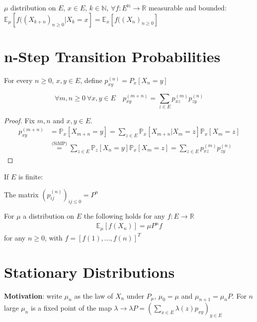 \begin{cor}
	$\mu$ distribution on $E$, $x \in E$, $k \in \mathbb{N}$, $\forall f: E^{\mathbb{N}} \to \mathbb{R}$ measurable and bounded:
	$\mathbb{E}_\mu \left[ f((X_{k+n})_{n \geq 0} | X_k =x \right] = \mathbb{E} _x \left[ f((X_n)_{n \geq 0} \right]  $
\end{cor}

\noindent
\section{n-Step Transition Probabilities}
\begin{defn}
	For every $n\geq0$, $x, y \in E$, define $p_{xy}^{(n)}=P_x[X_n=y]$
\end{defn}

\begin{prop}
\begin{equation}
	\forall m,n \geq 0 \ \forall x,y \in E \quad \boxed{ p_{xy}^{(m+n)}= \sum_{z \in E} p_{xz}^{(m)}p_{zy}^{(n)}}
\end{equation}
	
\end{prop}
\begin{proof}
Fix $m,n$ and $x,y \in E$.
	\begin{align}
		p_{xy}^{(m+n)} &=
			\mathbb{P}_{x} \left[ X_{m+n}=y \right] =
			\sum_{z \in E}^{} \mathbb{P}_{x} \left[ X_{m+n} | X_m = z \right] \mathbb{P}_{x} \left[ X_m = z \right] \\
		&\stackrel{\textrm{(SiMP)}}{=} \sum_{z \in E}^{} \mathbb{P}_{z} \left[ X_n=y \right] \mathbb{P}_{x} \left[ X_m=z \right] = \sum_{z \in E}^{} p_{xz}^{(m)} p_{zy}^{(n)}  	
	\end{align}
	
\end{proof}


\begin{rmk}[]
	If $E$ is finite:
\itemize
\item The matrix $(p_{ij}^{(n)})_{ij \leq 0}=P^n$
\item For $\mu$ a distribution on $E$ the following holds for any $f:E \to \mathbb{R}$
	\begin{align}
	\mathbb{E}_{\mu} \left[ f(X_n) \right] = \mu P^n f
\end{align}
for any $n\geq 0$, with $f = [f(1), \ldots ,f(n)]^T$
\end{rmk}

\section{Stationary Distributions}
\textbf{Motivation}: write $\mu_{n}$ as the law of $X_{n}$ under $P_{\mu}$, $\mu_0=\mu$ and $\mu_{n+1}=\mu_{n}P$. For $n$ large $\mu_n$ is a fixed point of the map $\lambda \to \lambda P = \left( \sum_{x \in E} \lambda(z)p_{xy} \right)_{y \in E}$

